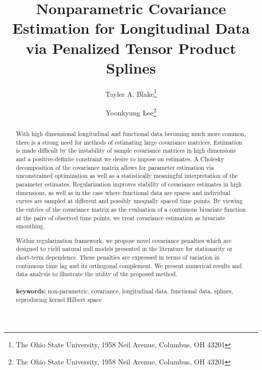 \documentclass[12pt]{article}
\theoremstyle{definition}
\def\bL{\mathbf{L}}
\begin{document}
\def\bL{\mathbf{L}}



\title{ Nonparametric Covariance Estimation for Longitudinal Data via Penalized Tensor Product Splines}

\author{Tayler A. Blake\thanks{The Ohio State University, 1958 Neil Avenue, Columbus, OH 43201} \and  Yoonkyung Lee\thanks{The Ohio State University, 1958 Neil Avenue, Columbus, OH 43201}}


\maketitle

\begin{abstract}
With high dimensional longitudinal and functional data becoming much more common, there is a strong need for methods of estimating large covariance matrices. Estimation is made difficult  by the instability of sample covariance matrices in high dimensions and a positive-definite constraint we desire to impose on estimates. A Cholesky decomposition of the covariance matrix allows for parameter estimation via unconstrained optimization as well as a statistically meaningful interpretation of the parameter estimates. Regularization improves stability of covariance estimates in high dimensions, as well as in the case where functional data are sparse and individual curves are sampled at different and possibly unequally spaced time points. By viewing the entries of the covariance matrix as the evaluation of a continuous bivariate function at the pairs of observed time points, we treat covariance estimation as bivariate smoothing. 

Within regularization framework, we propose novel covariance penalties which are designed to yield natural null models presented in the literature for stationarity or short-term dependence. These penalties are expressed in terms of variation in continuous time lag and its orthogonal complement. We present numerical results and data analysis to illustrate the utility of the proposed method. \\
\\
{\bf keywords:} non-parametric, covariance, longitudinal data, functional data, splines, reproducing kernel Hilbert space
\end{abstract}
\end{document}

